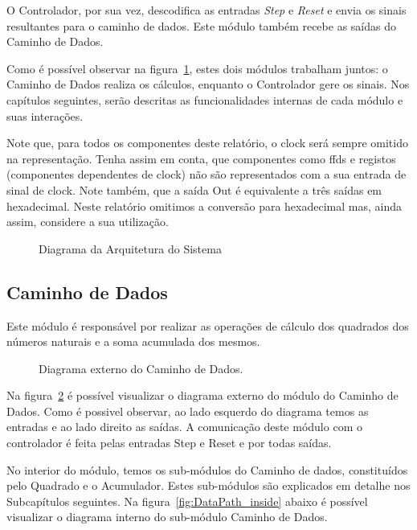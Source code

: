 O Controlador, por sua vez, descodifica as entradas \textit{Step} e \textit{Reset} e envia os sinais resultantes para o caminho de dados. Este módulo também recebe as saídas do Caminho de Dados.

Como é possível observar na figura~\ref{fig:arq_sist}, estes dois módulos trabalham juntos: o Caminho de Dados realiza os cálculos, enquanto o Controlador gere os sinais. Nos capítulos seguintes, serão descritas as funcionalidades internas de cada módulo e suas interações.

\begin{infoclean}
    Note que, para todos os componentes deste relatório, o \gls{clock} será sempre omitido na representação. Tenha assim em conta, que componentes como \glspl{ffd} e registos (componentes dependentes de \gls{clock}) não são representados com a sua entrada de sinal de \gls{clock}. Note também, que a saída Out é equivalente a três saídas em hexadecimal. Neste relatório omitimos a conversão para hexadecimal mas, ainda assim, considere a sua utilização.
\end{infoclean}

\begin{figure}[H]
    \centering
    
    \caption{Diagrama da Arquitetura do Sistema}\label{fig:arq_sist}
\end{figure}

\subsection{Caminho de Dados}

Este módulo é responsável por realizar as operações de cálculo dos quadrados dos números naturais e a soma acumulada dos mesmos.

\begin{figure}[H]
    \centering
    
    \caption{Diagrama externo do Caminho de Dados.}\label{fig:DataPath}
\end{figure}

Na figura~\ref{fig:DataPath} é possível visualizar o diagrama externo do módulo do Caminho de Dados. Como é possivel observar, ao lado esquerdo do diagrama temos as entradas e ao lado direito as saídas. A comunicação deste módulo com o controlador é feita pelas entradas Step e Reset e por todas saídas.

No interior do módulo, temos os sub-módulos do Caminho de dados, constituídos pelo Quadrado e o Acumulador. Estes sub-módulos são explicados em detalhe nos Subcapítulos seguintes. Na figura~\ref{fig:DataPath_inside} abaixo é possível visualizar o diagrama interno do sub-módulo Caminho de Dados.

